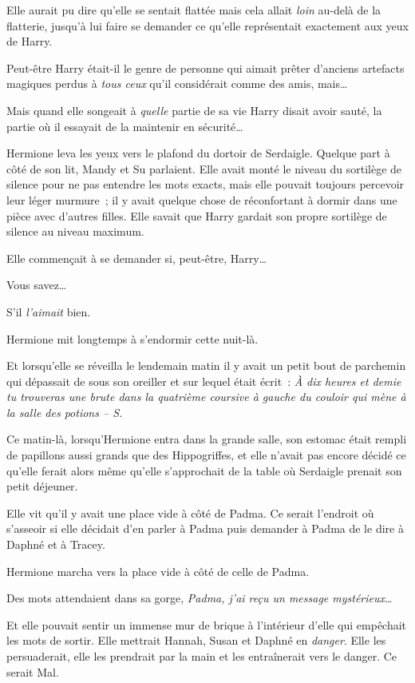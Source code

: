 Elle aurait pu dire qu'elle se sentait flattée mais cela allait \emph{loin} au-delà de la flatterie, jusqu'à lui faire se demander ce qu'elle représentait exactement aux yeux de Harry.

Peut-être Harry était-il le genre de personne qui aimait prêter d'anciens artefacts magiques perdus à \emph{tous ceux} qu'il considérait comme des amis, mais…

Mais quand elle songeait à \emph{quelle} partie de sa vie Harry disait avoir sauté, la partie où il essayait de la maintenir en sécurité…

Hermione leva les yeux vers le plafond du dortoir de Serdaigle.
Quelque part à côté de son lit, Mandy et Su parlaient.
Elle avait monté le niveau du sortilège de silence pour ne pas entendre les mots exacts, mais elle pouvait toujours percevoir leur léger murmure~; il y avait quelque chose de réconfortant à dormir dans une pièce avec d'autres filles.
Elle savait que Harry gardait son propre sortilège de silence au niveau maximum.

Elle commençait à se demander si, peut-être, Harry…

Vous savez…

S'il \emph{l'aimait} bien.

Hermione mit longtemps à s'endormir cette nuit-là.

Et lorsqu'elle se réveilla le lendemain matin il y avait un petit bout de parchemin qui dépassait de sous son oreiller et sur lequel était écrit~: \emph{À dix heures et demie tu trouveras une brute dans la quatrième coursive à gauche du couloir qui mène à la salle des potions -- S.}

\later

Ce matin-là, lorsqu'Hermione entra dans la grande salle, son estomac était rempli de papillons aussi grands que des Hippogriffes, et elle n'avait pas encore décidé ce qu'elle ferait alors même qu'elle s'approchait de la table où Serdaigle prenait son petit déjeuner.

Elle vit qu'il y avait une place vide à côté de Padma.
Ce serait l'endroit où s'asseoir si elle décidait d'en parler à Padma puis demander à Padma de le dire à Daphné et à Tracey.

Hermione marcha vers la place vide à côté de celle de Padma.

Des mots attendaient dans sa gorge, \emph{Padma, j'ai reçu un message mystérieux}…

Et elle pouvait sentir un immense mur de brique à l'intérieur d'elle qui empêchait les mots de sortir.
Elle mettrait Hannah, Susan et Daphné en \emph{danger}.
Elle les persuaderait, elle les prendrait par la main et les entraînerait vers le danger.
Ce serait Mal.

